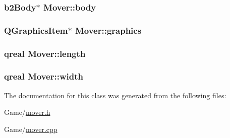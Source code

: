 \subsubsection[{\texorpdfstring{body}{body}}]{\setlength{\rightskip}{0pt plus 5cm}b2\+Body$\ast$ Mover\+::body}\hypertarget{class_mover_a6e91384098180f0fef918dd45f97f201}{}\label{class_mover_a6e91384098180f0fef918dd45f97f201}
\subsubsection[{\texorpdfstring{graphics}{graphics}}]{\setlength{\rightskip}{0pt plus 5cm}Q\+Graphics\+Item$\ast$ Mover\+::graphics}\hypertarget{class_mover_a111eebc06a95c11dc6f48dcc6a33478f}{}\label{class_mover_a111eebc06a95c11dc6f48dcc6a33478f}
\subsubsection[{\texorpdfstring{length}{length}}]{\setlength{\rightskip}{0pt plus 5cm}qreal Mover\+::length}\hypertarget{class_mover_a2c55f3d5a807d328bcc8c73cdef5dda2}{}\label{class_mover_a2c55f3d5a807d328bcc8c73cdef5dda2}
\subsubsection[{\texorpdfstring{width}{width}}]{\setlength{\rightskip}{0pt plus 5cm}qreal Mover\+::width}\hypertarget{class_mover_ab78fbf587764d7cdcd417d2a444408d4}{}\label{class_mover_ab78fbf587764d7cdcd417d2a444408d4}


The documentation for this class was generated from the following files\+:\begin{DoxyCompactItemize}
\item 
Game/\hyperlink{mover_8h}{mover.\+h}\item 
Game/\hyperlink{mover_8cpp}{mover.\+cpp}\end{DoxyCompactItemize}
